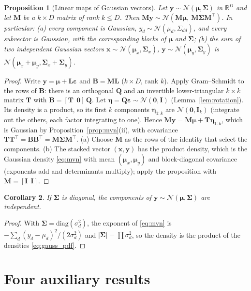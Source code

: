 \documentclass[11pt,a4paper]{article}
\numberwithin{equation}{section}
\theoremstyle{plain}
\newtheorem{proposition}{Proposition}[section]
\newtheorem{corollary}[proposition]{Corollary}
\theoremstyle{definition}
\theoremstyle{remark}
\newcommand{\x}{\mathbf{x}}
\newcommand{\y}{\mathbf{y}}
\newcommand{\eps}{\bm{\varepsilon}}
\newcommand{\mub}{\bm{\mu}}
\newcommand{\Sig}{\bm{\Sigma}}
\newcommand{\Lb}{\mathbf{L}}
\newcommand{\Qb}{\mathbf{Q}}
\newcommand{\I}{\mathbf{I}}
\newcommand{\R}{\mathbb{R}}
\newcommand{\N}{\mathcal{N}}
\begin{document}
\begin{proposition}[Linear maps of Gaussian vectors]
\label{prop:mvn_linear}
Let $\y\sim\N(\mub,\Sig)$ in $\R^D$ and let $\mathbf M$ be a $k\times D$ matrix of rank $k\le D$. Then $\mathbf M\y\sim\N(\mathbf M\mub,\ \mathbf M\Sig\mathbf M^\top)$. In particular:
(a) every component is Gaussian, $y_d\sim\N(\mu_d,\Sigma_{dd})$, and every subvector is Gaussian, with the corresponding blocks of $\mub$ and $\Sig$;
(b) the sum of two independent Gaussian vectors $\x\sim\N(\mub_x,\Sig_x)$, $\y\sim\N(\mub_y,\Sig_y)$ is $\N(\mub_x+\mub_y,\Sig_x+\Sig_y)$.
\end{proposition}
\begin{proof}
Write $\y=\mub+\Lb\eps$ and $\mathbf B=\mathbf M\Lb$ ($k\times D$, rank $k$). Apply Gram--Schmidt to the rows of $\mathbf B$: there is an orthogonal $\Qb$ and an invertible lower-triangular $k\times k$ matrix $\mathbf T$ with $\mathbf B=[\mathbf T\ \ \mathbf0]\,\Qb$.
Let $\bm\eta=\Qb\eps\sim\N(\mathbf0,\I)$ (Lemma~\ref{lem:rotation}). Its density is a product, so its first $k$ components $\bm\eta_{1:k}$ are $\N(\mathbf0,\I_k)$ (integrate out the others, each factor integrating to one).
Hence $\mathbf M\y=\mathbf M\mub+\mathbf T\bm\eta_{1:k}$, which is Gaussian by Proposition~\ref{prop:mvn}(ii), with covariance $\mathbf T\mathbf T^\top=\mathbf B\mathbf B^\top=\mathbf M\Sig\mathbf M^\top$.
(a) Choose $\mathbf M$ as the rows of the identity that select the components.
(b) The stacked vector $(\x,\y)$ has the product density, which is the Gaussian density \eqref{eq:mvn} with mean $(\mub_x,\mub_y)$ and block-diagonal covariance (exponents add and determinants multiply); apply the proposition with $\mathbf M=[\I\ \ \I]$.
\end{proof}

\begin{corollary}
\label{cor:uncorrelated}
If $\Sig$ is diagonal, the components of $\y\sim\N(\mub,\Sig)$ are independent.
\end{corollary}
\begin{proof}
With $\Sig=\mathrm{diag}(\sigma_d^2)$, the exponent of \eqref{eq:mvn} is $-\sum_d(y_d-\mu_d)^2/(2\sigma_d^2)$ and $|\Sig|=\prod\sigma_d^2$, so the density is the product of the densities \eqref{eq:gauss_pdf}.
\end{proof}

\section{Four auxiliary results}
\label{sec:aux}
\end{document}
